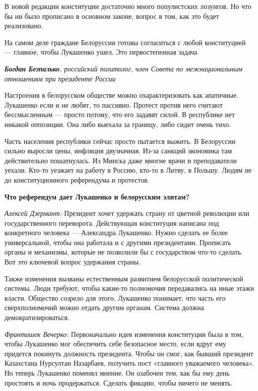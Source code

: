 В новой редакции конституции достаточно много популистских лозунгов. Но что бы ни было прописано в основном законе, вопрос в том, как это будет реализовано.

\begin{fancyquotes}
    На самом деле граждане Белоруссии готовы согласиться с любой конституцией — главное, чтобы Лукашенко ушел. Это первостепенная задача
\end{fancyquotes}

\textit{\textbf{Богдан Безпалько}, российский политолог, член Совета по межнациональным отношениям при президенте России}

Настроения в белорусском обществе можно охарактеризовать как апатичные. Лукашенко если и не любят, то пассивно. Протест против него считают бессмысленным — просто потому, что его задавят силой. В республике нет никакой оппозиции. Она либо выехала за границу, либо сидит очень тихо.

Часть населения республики сейчас просто пытается выжить. В Белоруссии сильно выросли цены, инфляция двузначная. Из-за санкций экономика там действительно пошатнулась. Из Минска даже многие врачи и преподаватели уехали. Кто-то уезжает на работу в Россию, кто-то в Литву, в Польшу. Людям не до конституционного референдума и протестов.

\textbf{Что референдум дает Лукашенко и белорусским элитам?}

\textit{Алексей Дзермант:} Президент хочет удержать страну от цветной революции или государственного переворота. Действующая конституция написана под конкретного человека — Александра Лукашенко. Нужно сделать ее более универсальной, чтобы она работала и с другими президентами. Прописать органы и механизмы, которые не позволили бы с государством что-то сделать. Вот это ключевой вопрос удержания страны.

Также изменения вызваны естественным развитием белорусской политической системы. Люди требуют, чтобы какие-то полномочия передавались на иные этажи власти. Общество созрело для этого. Лукашенко понимает, что часть его сверхполномочий можно отдать другим органам. Система должна демократизироваться.

\textit{Франтишек Вечерко:} Первоначально идея изменения конституции была в том, чтобы Лукашенко мог обеспечить себе безопасное место, если вдруг ему придется покинуть должность президента. Чтобы он смог, как бывший президент Казахстана Нурсултан Назарбаев, получить пост «главного уважаемого человека». Но теперь Лукашенко поменял мнение. Он озабочен тем, как бы ему день простоять и ночь продержаться. Сделать фикцию, чтобы ничего не менять.

